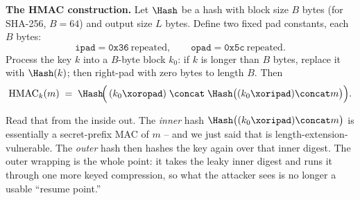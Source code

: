 \begin{focusbox}
\textbf{The HMAC construction.} Let $\Hash$ be a hash with block size $B$ bytes (for SHA-256, $B=64$) and output size $L$ bytes. Define two fixed pad constants, each $B$ bytes:
\[
  \texttt{ipad} = \texttt{0x36}\ \text{repeated},\qquad \texttt{opad} = \texttt{0x5c}\ \text{repeated}.
\]
Process the key $k$ into a $B$-byte block $k_0$: if $k$ is longer than $B$ bytes, replace it with $\Hash(k)$; then right-pad with zero bytes to length $B$. Then
\[
  \mathrm{HMAC}_k(m) \;=\; \Hash\!\Big(\,(k_0\xor\texttt{opad})\;\concat\;\Hash\big((k_0\xor\texttt{ipad})\concat m\big)\Big).
\]
\end{focusbox}

Read that from the inside out. The \emph{inner} hash $\Hash\big((k_0\xor\texttt{ipad})\concat m\big)$ is essentially a secret-prefix MAC of $m$ -- and we just said that is length-extension-vulnerable. The \emph{outer} hash then hashes the key again over that inner digest. The outer wrapping is the whole point: it takes the leaky inner digest and runs it through one more keyed compression, so what the attacker sees is no longer a usable ``resume point.''

\begin{center}
\end{center}


